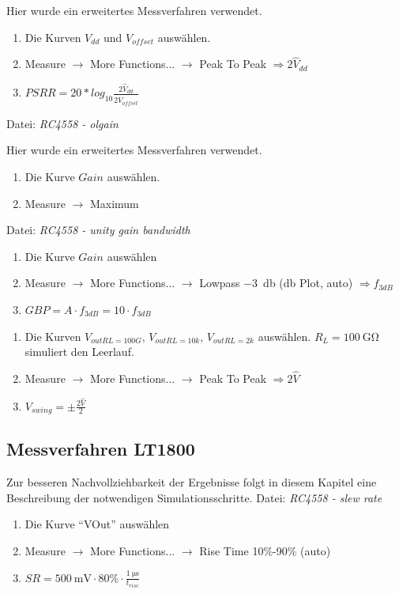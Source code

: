 \documentclass[
	ngerman,
	parskip=half,
	headsepline,
	twocolumn,
	DIV=calc,
	listof=leveldown,
	]{scrartcl}
\begin{document}
	Hier wurde ein erweitertes Messverfahren \cite{website:amp_psrr_cmrr_circuits} verwendet.
	\begin{enumerate}
		\item Die Kurven $V_{dd}$ und $V_{offset}$ auswählen.
		\item Measure $\rightarrow$ More Functions... $\rightarrow$ Peak To Peak $\Rightarrow 2\hat{V}_{dd}$
		\item $ PSRR = 20 * log_{10} \frac{2\hat{V}_{dd}}{2\hat{V}_{offset}}$
	\end{enumerate}

	Datei: \emph{RC4558 - olgain}
	
	Hier wurde ein erweitertes Messverfahren \cite{website:amp_psrr_cmrr_circuits} verwendet.
	\begin{enumerate}
		\item Die Kurve $Gain$ auswählen.
		\item Measure $\rightarrow$ Maximum
	\end{enumerate}
	

	Datei: \emph{RC4558 - unity gain bandwidth}
	\begin{enumerate}
		\item Die Kurve $Gain$ auswählen
		\item Measure $\rightarrow$ More Functions... $\rightarrow$ Lowpass \SI{-3}{\decibel} (db Plot, auto) $\Rightarrow f_{3dB}$
		\item $ GBP = A \cdot f_{3dB} = 10 \cdot f_{3dB} $
	\end{enumerate}

	\begin{enumerate}
		\item Die Kurven $V_{out RL=100G}$, $V_{out RL=10k}$, $V_{out RL=2k}$ auswählen. $R_L=\SI{100}{\giga\ohm}$ simuliert den Leerlauf.
		\item Measure $\rightarrow$ More Functions... $\rightarrow$ Peak To Peak $\Rightarrow 2\hat{V}$
		\item $V_{swing} = \pm \frac{2\hat{V}}{2}$
	\end{enumerate}

	\subsection{Messverfahren LT1800}
	\label{sec:appendix_measurement_methods_LT1800}
	Zur besseren Nachvollziehbarkeit der Ergebnisse folgt in diesem Kapitel eine Beschreibung der notwendigen Simulationsschritte. 	
	Datei: \emph{RC4558 - slew rate}
	\begin{enumerate}
		\item Die Kurve \enquote{VOut} auswählen
		\item Measure $\rightarrow$ More Functions... $\rightarrow$ Rise Time 10\%-90\% (auto)
		\item $SR = \SI{500}{\milli\volt} \cdot 80\% \cdot \frac{\SI{1}{\micro\second}}{t_{rise}}$
	\end{enumerate}
	
\end{document}
